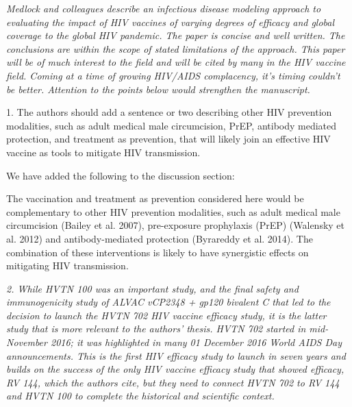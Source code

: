 \documentclass[12pt]{jpmletter}
\newenvironment{original}{\it}{}
\begin{document}
\begin{letter}{}
\begin{original}
      Medlock and colleagues describe an infectious disease modeling
      approach to evaluating the impact of HIV vaccines of varying
      degrees of efficacy and global coverage to the global HIV
      pandemic. The paper is concise and well written. The conclusions
      are within the scope of stated limitations of the approach. This
      paper will be of much interest to the field and will be cited by
      many in the HIV vaccine field. Coming at a time of growing
      HIV/AIDS complacency, it's timing couldn't be better. Attention
      to the points below would strengthen the manuscript.

      1. The authors should add a sentence or two describing other HIV
      prevention modalities, such as adult medical male circumcision,
      PrEP, antibody mediated protection, and treatment as prevention,
      that will likely join an effective HIV vaccine as tools to
      mitigate HIV transmission.
    \end{original}

    We have added the following to the discussion section:
    \begin{quoting}
      The vaccination and treatment as prevention considered here
      would be complementary to other HIV prevention modalities, such
      as adult medical male circumcision (Bailey et al. 2007),
      pre-exposure prophylaxis (PrEP) (Walensky et al. 2012) and
      antibody-mediated protection (Byrareddy et al. 2014). The
      combination of these interventions is likely to have synergistic
      effects on mitigating HIV transmission.
    \end{quoting}
    
    \begin{original}
      2. While HVTN 100 was an important study, and the final safety
      and immunogenicity study of ALVAC vCP2348 + gp120 bivalent C
      that led to the decision to launch the HVTN 702 HIV vaccine
      efficacy study, it is the latter study that is more relevant to
      the authors' thesis. HVTN 702 started in mid-November 2016; it
      was highlighted in many 01 December 2016 World AIDS Day
      announcements. This is the first HIV efficacy study to launch in
      seven years and builds on the success of the only HIV vaccine
      efficacy study that showed efficacy, RV 144, which the authors
      cite, but they need to connect HVTN 702 to RV 144 and HVTN 100
      to complete the historical and scientific context.
    \end{original}
    

\end{letter}
\end{document}
